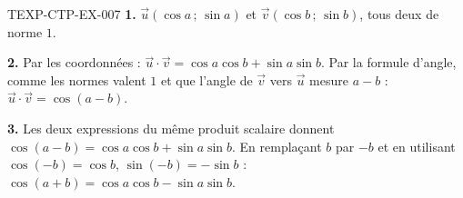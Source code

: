 \begin{corrige}{TEXP-CTP-EX-007}
\textbf{1.} $\vec u(\cos a\,;\,\sin a)$ et $\vec v(\cos b\,;\,\sin b)$, tous
deux de norme $1$.

\textbf{2.} Par les coordonnées :
$\vec u\cdot\vec v=\cos a\cos b+\sin a\sin b$. Par la formule d'angle, comme
les normes valent $1$ et que l'angle de $\vec v$ vers $\vec u$ mesure $a-b$ :
$\vec u\cdot\vec v=\cos(a-b)$.

\textbf{3.} Les deux expressions du même produit scalaire donnent
$\cos(a-b)=\cos a\cos b+\sin a\sin b$. En remplaçant $b$ par $-b$ et en
utilisant $\cos(-b)=\cos b$, $\sin(-b)=-\sin b$ :
$\cos(a+b)=\cos a\cos b-\sin a\sin b$.
\end{corrige}
